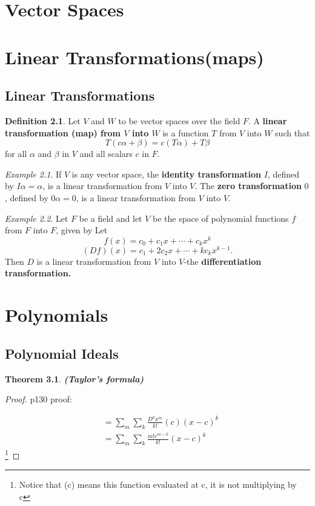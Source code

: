 \documentclass{book}
\newtheorem{thm}{Theorem}[section]
\theoremstyle{remark}
\newtheorem{example}{Example}[section]
\theoremstyle{definition}
\newtheorem{definition}{Definition}[section]
\begin{document}
\chapter{Vector Spaces}





\chapter{Linear Transformations(maps)}
\section{Linear Transformations}
\begin{definition}
Let $V$ and $W$ to be vector spaces over the field $F$. A \textbf{linear transformation (map) from $V$ into $W$} is a function $T$ from $V$ into $W$ such that 
\begin{equation}
    T(c\alpha + \beta) = c(T\alpha) + T\beta
\end{equation}
for all $\alpha$ and $\beta$ in $V$ and all scalars $c$ in $F$. 
\end{definition}

\begin{example}If $V$ is any vector space, the \textbf{identity transformation} $I$, defined by $I \alpha=\alpha$, is a linear transformation from $V$ into $V$. The \textbf{zero transformation} 0 , defined by $0 \alpha=0$, is a linear transformation from $V$ into $V$.
\end{example}
\begin{example}Let $F$ be a field and let $V$ be the space of polynomial functions $f$ from $F$ into $F$, given by
Let
$$
f(x)=c_0+c_1 x+\cdots+c_k x^k
$$
$$
(D f)(x)=c_1+2 c_2 x+\cdots+k c_k x^{k-1} .
$$
Then $D$ is a linear transformation from $V$ into $V$-the \textbf{differentiation transformation.}
\end{example}

\chapter{Polynomials}
\section{Polynomial Ideals}
\begin{thm}
    \textbf{(Taylor's formula)}
\end{thm}
\begin{proof}
    p130 proof: 

\begin{align}
    &= \sum_m {\sum_k{\frac{D^k x^m}{k!}(c)(x-c)^k}} \\
    &= \sum_m {\sum_k{\frac{m! c^{m-k}}{k!}(x-c)^k}}
\end{align}
\footnote{Notice that (c) means this function evaluated at c, it is not multiplying by c}
\end{proof}
\end{document}
